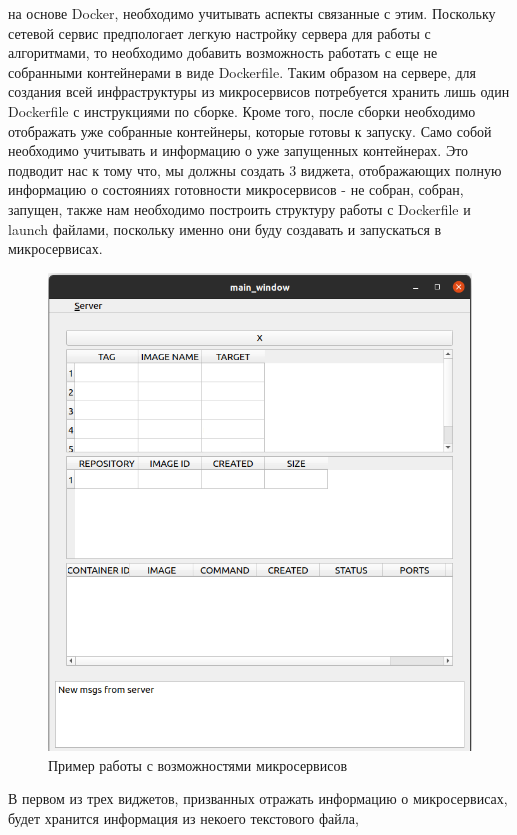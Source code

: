 \documentclass[a4paper, 14pt]{extreport}
\begin{document}
на основе Docker, необходимо учитывать аспекты связанные с этим. Поскольку сетевой сервис предпологает легкую настройку сервера для 
работы с алгоритмами, то необходимо добавить возможность работать с еще не собранными контейнерами в виде Dockerfile. Таким образом
на сервере, для создания всей инфраструктуры из микросервисов потребуется хранить лишь один Dockerfile с инструкциями по сборке.
Кроме того, после сборки необходимо отображать уже собранные контейнеры, которые готовы к запуску. Само собой необходимо учитывать и 
информацию о уже запущенных контейнерах. Это подводит нас к тому что, мы должны создать 3 виджета, отображающих полную информацию о 
состояниях готовности микросервисов - не собран, собран, запущен, также нам необходимо построить структуру работы с Dockerfile и launch 
файлами, поскольку именно они буду создавать и запускаться в микросервисах.
\begin{figure}[ht]
\begin{center}
\includegraphics[scale = 0.4]{./figure/app_examp}
\caption{Пример работы с возможностями микросервисов}
\label{fig:manip_photo}
\end{center}
\end{figure}
\par В первом из трех виджетов, призванных отражать информацию о микросервисах, будет хранится информация из некоего текстового файла,
\end{document}

